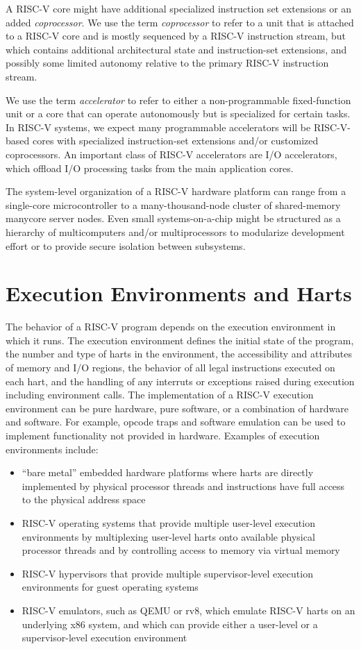 A RISC-V core might have additional specialized instruction set
extensions or an added {\em coprocessor}.  We use the term {\em
  coprocessor} to refer to a unit that is attached to a RISC-V core
and is mostly sequenced by a RISC-V instruction stream, but which
contains additional architectural state and instruction-set
extensions, and possibly some limited autonomy relative to the
primary RISC-V instruction stream.

We use the term {\em accelerator} to refer to either a
non-programmable fixed-function unit or a core that can operate
autonomously but is specialized for certain tasks.  In RISC-V systems,
we expect many programmable accelerators will be RISC-V-based cores
with specialized instruction-set extensions and/or customized
coprocessors.  An important class of RISC-V accelerators are I/O
accelerators, which offload I/O processing tasks from the main
application cores.

The system-level organization of a RISC-V hardware platform can range
from a single-core microcontroller to a many-thousand-node cluster of
shared-memory manycore server nodes.  Even small systems-on-a-chip
might be structured as a hierarchy of multicomputers and/or
multiprocessors to modularize development effort or to provide secure
isolation between subsystems.

\section{Execution Environments and Harts}

The behavior of a RISC-V program depends on the execution environment
in which it runs.  The execution environment defines the initial state
of the program, the number and type of harts in the environment, the
accessibility and attributes of memory and I/O regions, the behavior
of all legal instructions executed on each hart, and the handling of
any interruts or exceptions raised during execution including
environment calls.  The implementation of a RISC-V execution
environment can be pure hardware, pure software, or a combination of
hardware and software.  For example, opcode traps and software
emulation can be used to implement functionality not provided in
hardware.  Examples of execution environments include:
\begin{itemize}
  \item ``bare metal'' embedded hardware platforms where harts are
    directly implemented by physical processor threads and
    instructions have full access to the physical address space
  \item RISC-V operating systems that provide multiple user-level
    execution environments by multiplexing user-level harts onto
    available physical processor threads and by controlling access to
    memory via virtual memory
  \item RISC-V hypervisors that provide multiple supervisor-level
    execution environments for guest operating systems
  \item RISC-V emulators, such as QEMU or rv8, which emulate RISC-V
    harts on an underlying x86 system, and which can provide either a
    user-level or a supervisor-level execution environment
\end{itemize}

